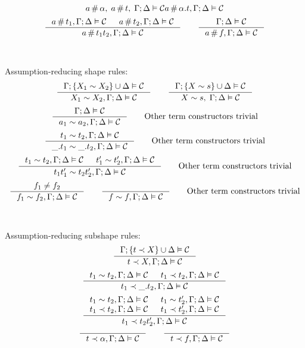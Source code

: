 \documentclass[english, mgr]{iithesis}
\begin{document}
\begin{appendices}
$${  a \,\#\, \alpha, \; a \,\#\, t,\;\Gamma ; \Delta \vDash \mathcal{C}
}{
  a \,\#\, \alpha. t , \Gamma ; \Delta \vDash \mathcal{C}
}
$$
$$
\inference{
  \atomv \cfresh \term_1 , \cEnv ; \icEnv \vDash \sconstr &
  \atomv \cfresh \term_2 , \cEnv ; \icEnv \vDash \sconstr
}{
  \atomv \cfresh \term_1 \term_2 , \cEnv ; \icEnv \vDash \sconstr
}
\qquad
\inference{
  \cEnv ; \icEnv \vDash \sconstr
}{
  \atomv \cfresh \symb, \cEnv ; \icEnv \vDash \sconstr
}
$$
\\
\\
Assumption-reducing shape rules:
$$
\inference{
  \cEnv ; \{\termv_1 \csheq \termv_2\} \cup \icEnv \vDash \sconstr
}{
  \termv_1 \csheq \termv_2, \cEnv ; \icEnv \vDash \sconstr
}
\qquad
\inference{
  \cEnv ; \{\termv \csheq \shape\} \cup \icEnv \vDash \sconstr
}{
  \termv \csheq \shape,\; \cEnv ; \icEnv \vDash \sconstr
}
$$
$$
\inference{
  \cEnv ; \icEnv \vDash \sconstr
}{
  \atomv_1 \csheq \atomv_2, \cEnv ; \icEnv \vDash \sconstr
}
\qquad
\text{Other term constructors trivial}
$$
$$
\inference{
  \term_1 \csheq \term_2, \cEnv ; \icEnv \vDash \sconstr
}{
  \shbind\term_1 \csheq \shbind\term_2, \cEnv ; \icEnv \vDash \sconstr
}
\qquad
\text{Other term constructors trivial}
$$
$$
\inference{
  \term_1  \csheq \term_2 , \cEnv ; \icEnv \vDash \sconstr
  &
  \term_1' \csheq \term_2', \cEnv ; \icEnv \vDash \sconstr
}{
  \term_1 \term_1' \csheq \term_2\term_2', \cEnv ; \icEnv \vDash \sconstr
}
\qquad
\text{Other term constructors trivial}
$$
$$
\inference{
  \symb_1 \neq \symb_2
}{
  \symb_1 \csheq \symb_2 , \cEnv ; \icEnv \vDash \sconstr
}
\qquad
\inference{
}{
  \symb \csheq \symb , \cEnv ; \icEnv \vDash \sconstr
}
\qquad
\text{Other term constructors trivial}
$$
\\
\\
Assumption-reducing subshape rules:
$$
\inference{
  \cEnv ; \{\term \cshlt \termv\} \cup \icEnv \vDash \sconstr
}{
  \term \cshlt \termv, \cEnv ; \icEnv \vDash \sconstr
}
$$
$$
\inference{
  \term_1 \csheq \term_2, \cEnv ; \icEnv \vDash \sconstr
  &
  \term_1 \cshlt \term_2, \cEnv ; \icEnv \vDash \sconstr
}{
  \term_1 \cshlt \shbind \term_2, \cEnv ; \icEnv \vDash \sconstr
}
$$
$$
\inference{
  \term_1 \csheq \term_2, \cEnv ; \icEnv \vDash \sconstr
  &
  \term_1 \csheq \term_2', \cEnv ; \icEnv \vDash \sconstr
  \\
  \term_1 \cshlt \term_2, \cEnv ; \icEnv \vDash \sconstr
  &
  \term_1 \cshlt \term_2', \cEnv ; \icEnv \vDash \sconstr
}{
  \term_1 \cshlt \term_2 \term_2', \cEnv ; \icEnv \vDash \sconstr
}
$$
$$
\inference{
}{
  \term \cshlt \atomexp, \cEnv ; \icEnv \vDash \sconstr
}
\qquad
\inference{
}{
  \term \cshlt \symb, \cEnv ; \icEnv \vDash \sconstr
}
$$

\end{appendices}
\end{document}

